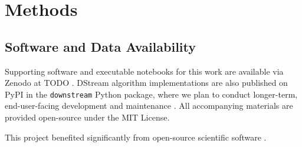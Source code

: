 \section{Methods} \label{sec:methods}

\subsection{Software and Data Availability} \label{sec:materials}

Supporting software and executable notebooks for this work are available via Zenodo at TODO \citep{moreno2024hsurf}.
DStream algorithm implementations are also published on PyPI in the \texttt{downstream} Python package, where we plan to conduct longer-term, end-user-facing development and maintenance \citep{moreno2024downstream}.
All accompanying materials are provided open-source under the MIT License.

This project benefited significantly from open-source scientific software \citep{2020SciPy-NMeth,harris2020array,reback2020pandas,mckinney-proc-scipy-2010,waskom2021seaborn,hunter2007matplotlib,moreno2023teeplot}.
